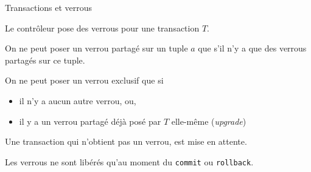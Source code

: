 \begin{frame}{Transactions et verrous}

Le contrôleur pose des verrous pour une transaction $T$.

\begin{redbullet}
  \item On ne peut poser un \alert{verrou partagé} sur un tuple $a$ 
       que s'il n'y a que des verrous partagés sur ce tuple.
  \item On ne peut poser un \alert{verrou exclusif} que si
  
     \begin{itemize}
        \item il n'y a aucun autre verrou, \alert{ou},
         \item il y a un verrou partagé déjà posé par $T$ elle-même (\textit{upgrade})
         \end{itemize}
 \end{redbullet}
 
 \vfill
\begin{blocgauche}
\begin{redbullet}
  \item Une transaction qui n'obtient pas un verrou,  \alert{est mise en attente}. 
\item Les verrous ne sont libérés qu'au moment du \texttt{commit} ou
\texttt{rollback}.
\end{redbullet}
\end{blocgauche}

\end{frame}


